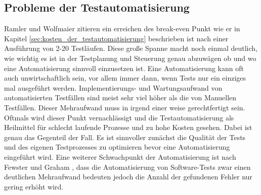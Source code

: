 \subsection{Probleme der Testautomatisierung}
\label{sec:probleme_der_testautomatisierung}
Ramler und Wolfmaier \cite{ramler_economic_2006} zitieren ein erreichen des break-even Punkt wie er in Kapitel \ref{sec:kosten_der_testautomatisierung} beschrieben ist nach einer Ausführung von 2-20 Testläufen. Diese große Spanne macht noch einmal deutlich, wie wichtig es ist in der Testplanung und Steuerung genau abzuwägen ob und wo eine Automatisierung sinnvoll einzusetzen ist. Eine Automatisierung kann oft auch unwirtschaftlich sein, vor allem immer dann, wenn Tests nur ein einziges mal ausgeführt werden. Implementierungs- und Wartungsaufwand von automatisierten Testfällen sind meist sehr viel höher als die von Manuellen Testfällen. Dieser Mehraufwand muss in irgend einer weise gerechtfertigt sein. Oftmals wird dieser Punkt vernachlässigt und die Testautomatisierung als Heilmittel für schlecht laufende Prozesse und zu hohe Kosten gesehen. Dabei ist genau das Gegenteil der Fall. Es ist sinnvoller zunächst die Qualität der Tests und des eigenen Testprozesses zu optimieren bevor eine Automatisierung eingeführt wird. 
Eine weiterer Schwachpunkt der Automatisierung ist nach Fewster und Graham \cite[vgl. S. 22 ff.]{fewster_software_1999}, dass die Automatisierung von Software-Tests zwar einen deutlichen Mehraufwand bedeuten jedoch die Anzahl der gefundenen Fehler nur gering erhöht wird.
